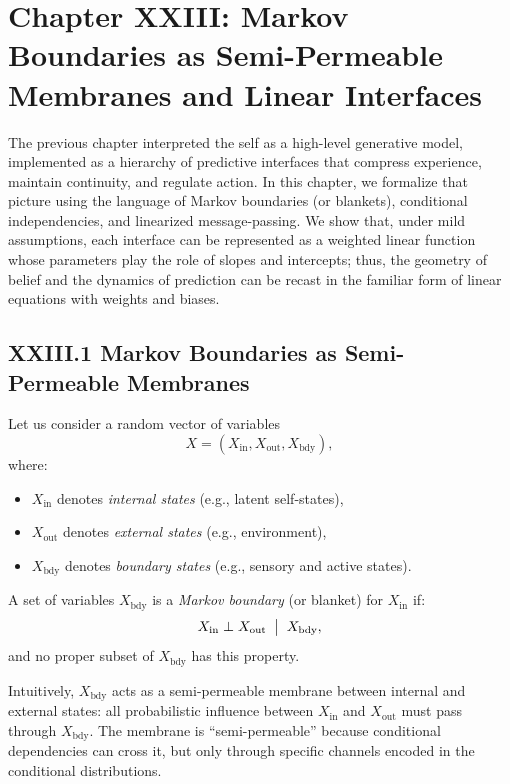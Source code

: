 \documentclass[12pt,letterpaper]{article}
\begin{document}
\newpage
\section{Chapter XXIII: Markov Boundaries as Semi-Permeable Membranes and Linear Interfaces}

The previous chapter interpreted the self as a high-level generative model, implemented as a hierarchy of predictive interfaces that compress experience, maintain continuity, and regulate action. In this chapter, we formalize that picture using the language of Markov boundaries (or blankets), conditional independencies, and linearized message-passing. We show that, under mild assumptions, each interface can be represented as a weighted linear function whose parameters play the role of slopes and intercepts; thus, the geometry of belief and the dynamics of prediction can be recast in the familiar form of linear equations with weights and biases.

\subsection{XXIII.1 Markov Boundaries as Semi-Permeable Membranes}

Let us consider a random vector of variables
\[
X = (X_{\text{in}}, X_{\text{out}}, X_{\text{bdy}}),
\]
where:

\begin{itemize}
  \item $X_{\text{in}}$ denotes \emph{internal states} (e.g., latent self-states),
  \item $X_{\text{out}}$ denotes \emph{external states} (e.g., environment),
  \item $X_{\text{bdy}}$ denotes \emph{boundary states} (e.g., sensory and active states).
\end{itemize}

\begin{definition}
A set of variables $X_{\text{bdy}}$ is a \emph{Markov boundary} (or blanket) for $X_{\text{in}}$ if:
\[
X_{\text{in}} \perp X_{\text{out}} \;\bigm|\; X_{\text{bdy}},
\]
and no proper subset of $X_{\text{bdy}}$ has this property.
\end{definition}

Intuitively, $X_{\text{bdy}}$ acts as a semi-permeable membrane between internal and external states: all probabilistic influence between $X_{\text{in}}$ and $X_{\text{out}}$ must pass through $X_{\text{bdy}}$. The membrane is ``semi-permeable'' because conditional dependencies can cross it, but only through specific channels encoded in the conditional distributions.
\end{document}
